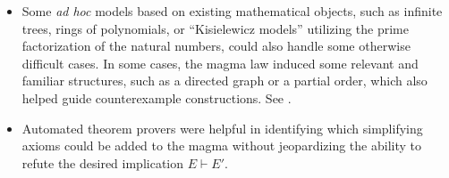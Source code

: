 \begin{itemize}
        \item Some \emph{ad hoc} models based on existing mathematical objects, such as infinite trees, rings of polynomials, or ``Kisielewicz models'' utilizing the prime factorization of the natural numbers, could also handle some otherwise difficult cases.  In some cases, the magma law induced some relevant and familiar structures, such as a directed graph or a partial order, which also helped guide counterexample constructions. See .
        \item Automated theorem provers were helpful in identifying which simplifying axioms could be added to the magma without jeopardizing the ability to refute the desired implication $E \vdash E'$.
\end{itemize}

